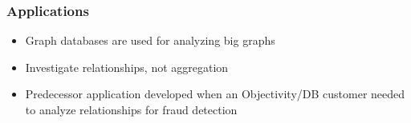
\begin{frame}
\frametitle{Applications}
\begin{itemize}
    \item Graph databases are used for analyzing big graphs
    \item Investigate relationships, not aggregation
    \item Predecessor application developed when an Objectivity/DB customer needed to analyze relationships for fraud detection
\end{itemize}
\end{frame}